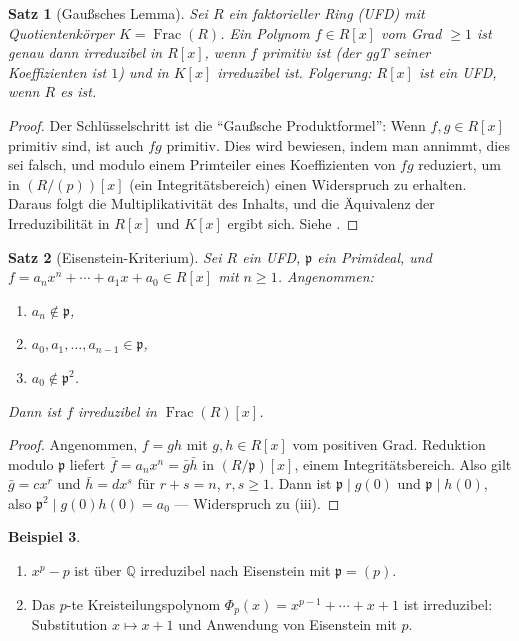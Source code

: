 \documentclass[12pt,a4paper]{amsart}
\newtheorem{theorem}{Satz}[section]
\theoremstyle{definition}
\newtheorem{example}[theorem]{Beispiel}
\theoremstyle{definition}
\DeclareMathOperator{\Frac}{Frac}
\begin{document}
\begin{theorem}[Gaußsches Lemma]
Sei $R$ ein faktorieller Ring (UFD) mit Quotientenkörper $K = \Frac(R)$.
Ein Polynom $f \in R[x]$ vom Grad $\geq 1$ ist genau dann irreduzibel in $R[x]$,
wenn $f$ \emph{primitiv} ist (der ggT seiner Koeffizienten ist $1$) und in $K[x]$
irreduzibel ist. Folgerung: $R[x]$ ist ein UFD, wenn $R$ es ist.
\end{theorem}

\begin{proof}
Der Schlüsselschritt ist die ``Gaußsche Produktformel'': Wenn $f, g \in R[x]$
primitiv sind, ist auch $fg$ primitiv. Dies wird bewiesen, indem man annimmt,
dies sei falsch, und modulo einem Primteiler eines Koeffizienten von $fg$ reduziert,
um in $(R/(p))[x]$ (ein Integritätsbereich) einen Widerspruch zu erhalten. Daraus
folgt die Multiplikativität des Inhalts, und die Äquivalenz der Irreduzibilität in
$R[x]$ und $K[x]$ ergibt sich. Siehe \cite[IV, \S2]{Lang2002}.
\end{proof}

\begin{theorem}[Eisenstein-Kriterium]\label{satz:eisenstein}
Sei $R$ ein UFD, $\mathfrak{p}$ ein Primideal, und
$f = a_n x^n + \cdots + a_1 x + a_0 \in R[x]$ mit $n \geq 1$.
Angenommen:
\begin{enumerate}[label=(\roman*)]
  \item $a_n \notin \mathfrak{p}$,
  \item $a_0, a_1, \ldots, a_{n-1} \in \mathfrak{p}$,
  \item $a_0 \notin \mathfrak{p}^2$.
\end{enumerate}
Dann ist $f$ irreduzibel in $\Frac(R)[x]$.
\end{theorem}

\begin{proof}
Angenommen, $f = gh$ mit $g, h \in R[x]$ vom positiven Grad. Reduktion modulo $\mathfrak{p}$
liefert $\bar{f} = a_n x^n = \bar{g}\bar{h}$ in $(R/\mathfrak{p})[x]$, einem Integritätsbereich.
Also gilt $\bar{g} = cx^r$ und $\bar{h} = dx^s$ für $r + s = n$, $r, s \geq 1$.
Dann ist $\mathfrak{p} \mid g(0)$ und $\mathfrak{p} \mid h(0)$, also
$\mathfrak{p}^2 \mid g(0)h(0) = a_0$ --- Widerspruch zu (iii).
\end{proof}

\begin{example}
\begin{enumerate}[label=(\alph*)]
  \item $x^p - p$ ist über $\mathbb{Q}$ irreduzibel nach Eisenstein mit $\mathfrak{p}=(p)$.
  \item Das $p$-te Kreisteilungspolynom $\Phi_p(x) = x^{p-1} + \cdots + x + 1$ ist
        irreduzibel: Substitution $x \mapsto x+1$ und Anwendung von Eisenstein mit $p$.
\end{enumerate}
\end{example}
\end{document}
